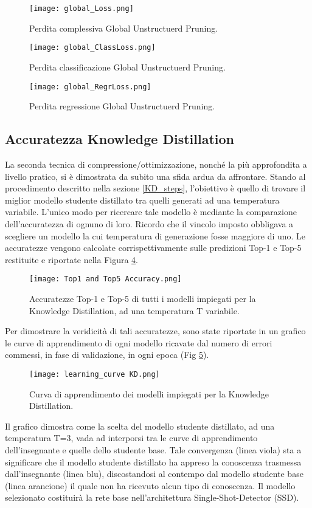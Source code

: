 \begin{figure}
    \centering
    \texttt{[image: global\_Loss.png]}
    \centering
    \caption{Perdita complessiva Global Unstructuerd Pruning.}
    \label{glob_loss_global_pruning}
\end{figure}
\begin{figure}
    \centering
    \texttt{[image: global\_ClassLoss.png]}
    \centering
    \caption{Perdita classificazione Global Unstructuerd Pruning.}
    \label{glob_loss_class_pruning}
\end{figure}
\begin{figure}
    \centering
    \texttt{[image: global\_RegrLoss.png]}
    \centering
    \caption{Perdita regressione Global Unstructuerd Pruning.}
    \label{glob_loss_regr_pruning}
\end{figure}

\subsection{Accuratezza Knowledge Distillation}
La seconda tecnica di compressione/ottimizzazione, nonché la più approfondita a livello pratico, si è dimostrata da subito una sfida ardua da affrontare. Stando al procedimento descritto nella sezione \ref{KD_steps}, l'obiettivo è quello di trovare il miglior modello studente distillato tra quelli generati ad una temperatura variabile. L'unico modo per ricercare tale modello è mediante la comparazione dell'accuratezza di ognuno di loro. Ricordo che il vincolo imposto obbligava a scegliere un modello la cui temperatura di generazione fosse maggiore di uno. Le accuratezze vengono calcolate corrispettivamente sulle predizioni Top-1 e Top-5 restituite e riportate nella Figura \ref{accuracy_KD}.
\begin{figure}
    \centering
    \texttt{[image: Top1 and Top5 Accuracy.png]}
    \centering
    \caption{Accuratezze Top-1 e Top-5 di tutti i modelli impiegati per la Knowledge Distillation, ad una temperatura T variabile.}
    \label{accuracy_KD}
\end{figure}
Per dimostrare la veridicità di tali accuratezze, sono state riportate in un grafico le curve di apprendimento di ogni modello ricavate dal numero di errori commessi, in fase di validazione, in ogni epoca (Fig \ref{lc_KD}).
\begin{figure}
    \centering
    \texttt{[image: learning\_curve KD.png]}
    \centering
    \caption{Curva di apprendimento dei modelli impiegati per la Knowledge Distillation.}
    \label{lc_KD}
\end{figure}
Il grafico dimostra come la scelta del modello studente distillato, ad una temperatura T=3, vada ad interporsi tra le curve di apprendimento dell'insegnante e quelle dello studente base. Tale convergenza (linea viola) sta a significare che il modello studente distillato ha appreso la conoscenza trasmessa dall'insegnante (linea blu), discostandosi al contempo dal modello studente base (linea arancione) il quale non ha ricevuto alcun tipo di conoscenza. Il modello selezionato costituirà la rete base nell'architettura Single-Shot-Detector (SSD). 

